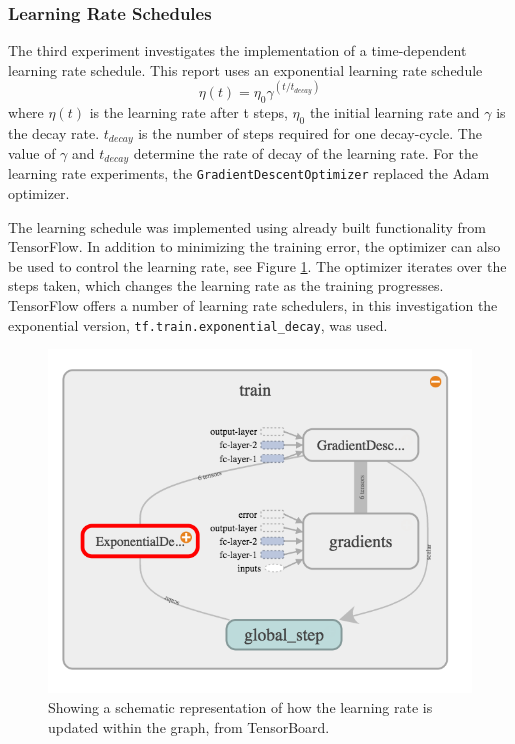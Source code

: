 \documentclass[]{article}
\begin{document}
\subsubsection{Learning Rate Schedules}

The third experiment investigates the implementation of a time-dependent learning rate schedule. This report uses an exponential learning rate schedule  
\begin{equation} \label{eq:1}
\eta(t) = \eta_{0} \gamma ^{(t / t_{decay})}
\end{equation}
where \(\eta(t)\) is the learning rate after t steps, \(\eta_{0}\) the initial learning rate and \(\gamma\) is the decay rate. \(t_{decay}\) is the number of steps required for one decay-cycle. The value of \(\gamma\) and \(t_{decay}\) determine the rate of decay of the learning rate. For the learning rate experiments, the \texttt{GradientDescentOptimizer} replaced the Adam optimizer.

The learning schedule was implemented using already built functionality from TensorFlow. In addition to minimizing the training error, the optimizer can also be used to control the learning rate, see Figure \ref{model_2}. The optimizer iterates over the steps taken, which changes the learning rate as the training progresses. TensorFlow offers a number of learning rate schedulers, in this investigation the exponential version, \texttt{tf.train.exponential\_decay}, was used. 

\begin{figure}[h]
	\includegraphics[width=\textwidth]{model_2}
	\caption{Showing a schematic representation of how the learning rate is updated within the graph, from TensorBoard.}
	\label{model_2}
	\centering
\end{figure}
\end{document}
